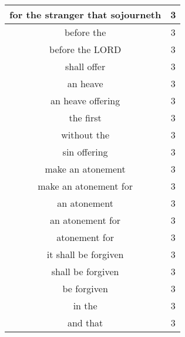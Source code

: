 \begin{center}
\begin{longtable}{|c|c|}
for the stranger that sojourneth & 3\\ \hline 
before the & 3\\ \hline 
before the LORD & 3\\ \hline 
shall offer & 3\\ \hline 
an heave & 3\\ \hline 
an heave offering & 3\\ \hline 
the first & 3\\ \hline 
without the & 3\\ \hline 
sin offering & 3\\ \hline 
make an atonement & 3\\ \hline 
make an atonement for & 3\\ \hline 
an atonement & 3\\ \hline 
an atonement for & 3\\ \hline 
atonement for & 3\\ \hline 
it shall be forgiven & 3\\ \hline 
shall be forgiven & 3\\ \hline 
be forgiven & 3\\ \hline 
in the & 3\\ \hline 
and that & 3\\ \hline 
\end{longtable}
\end{center}






